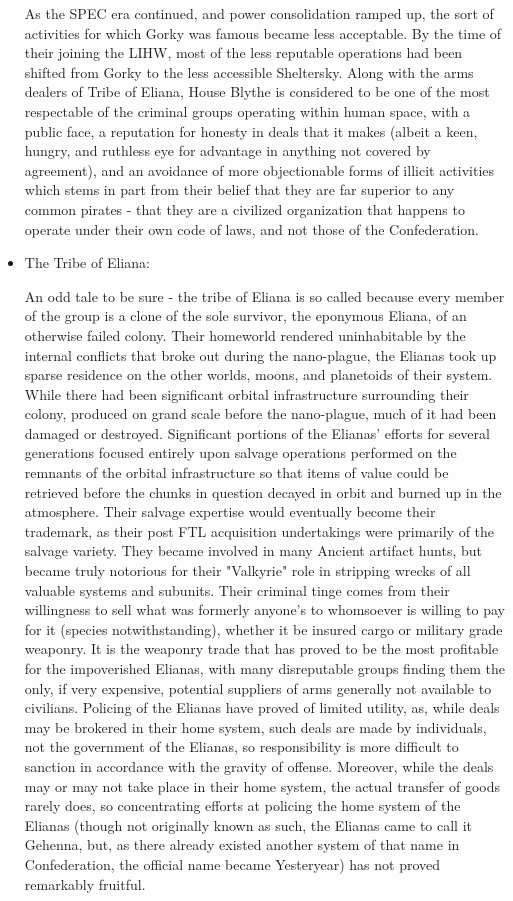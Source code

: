 \begin{itemize}
As the SPEC era continued, and power consolidation ramped up, the sort
of activities for which Gorky was famous became less acceptable. By
the time of their joining the LIHW, most of the less reputable
operations had been shifted from Gorky to the less accessible
Sheltersky. Along with the arms dealers of Tribe of Eliana, House
Blythe is considered to be one of the most respectable of the criminal
groups operating within human space, with a public face, a reputation
for honesty in deals that it makes (albeit a keen, hungry, and
ruthless eye for advantage in anything not covered by agreement), and
an avoidance of more objectionable forms of illicit activities which
stems in part from their belief that they are far superior to any
common pirates - that they are a civilized organization that happens
to operate under their own code of laws, and not those of the
Confederation.

\item The Tribe of Eliana: 

An odd tale to be sure - the tribe of Eliana is so called because
every member of the group is a clone of the sole survivor, the
eponymous Eliana, of an otherwise failed colony. Their homeworld
rendered uninhabitable by the internal conflicts that broke out during
the nano-plague, the Elianas took up sparse residence on the other
worlds, moons, and planetoids of their system. While there had been
significant orbital infrastructure surrounding their colony, produced
on grand scale before the nano-plague, much of it had been damaged or
destroyed. Significant portions of the Elianas' efforts for several
generations focused entirely upon salvage operations performed on the
remnants of the orbital infrastructure so that items of value could be
retrieved before the chunks in question decayed in orbit and burned up
in the atmosphere. Their salvage expertise would eventually become
their trademark, as their post FTL acquisition undertakings were
primarily of the salvage variety. They became involved in many Ancient
artifact hunts, but became truly notorious for their "Valkyrie" role
in stripping wrecks of all valuable systems and subunits. Their
criminal tinge comes from their willingness to sell what was formerly
anyone's to whomsoever is willing to pay for it (species
notwithstanding), whether it be insured cargo or military grade
weaponry. It is the weaponry trade that has proved to be the most
profitable for the impoverished Elianas, with many disreputable groups
finding them the only, if very expensive, potential suppliers of arms
generally not available to civilians. Policing of the Elianas have
proved of limited utility, as, while deals may be brokered in their
home system, such deals are made by individuals, not the government of
the Elianas, so responsibility is more difficult to sanction in
accordance with the gravity of offense. Moreover, while the deals may
or may not take place in their home system, the actual transfer of
goods rarely does, so concentrating efforts at policing the home
system of the Elianas (though not originally known as such, the
Elianas came to call it Gehenna, but, as there already existed another
system of that name in Confederation, the official name became
Yesteryear) has not proved remarkably fruitful.


\end{itemize}
